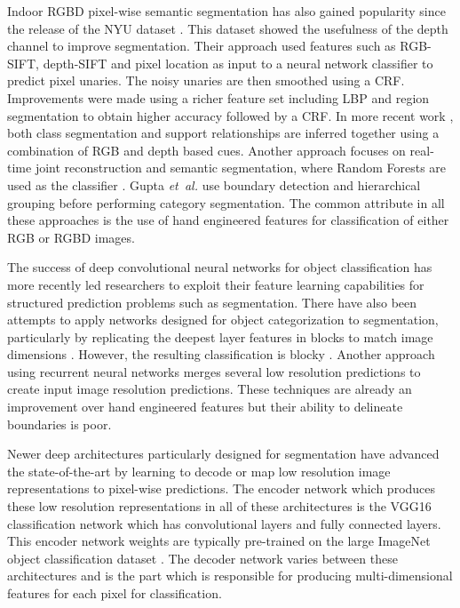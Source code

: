\documentclass[10pt,journal,compsoc]{IEEEtran}
\begin{document}
Indoor RGBD pixel-wise semantic segmentation has also gained popularity since the release of the NYU dataset \cite{silberman2012indoor}. This dataset showed the usefulness of the depth channel to improve segmentation. Their approach used features such as RGB-SIFT, depth-SIFT and pixel location as input to a neural network classifier to predict pixel unaries. The noisy unaries are then smoothed using a CRF. Improvements were made using a richer feature set including LBP and region segmentation to obtain higher accuracy \cite{ren2012rgb} followed by a CRF. In more recent work \cite{silberman2012indoor}, both class segmentation and support relationships are inferred together using a combination of RGB and depth based cues. Another approach focuses on real-time joint reconstruction and semantic segmentation, where Random Forests are used as the classifier \cite{Hermans14ICRA}. Gupta \emph{et~al.}  \cite{gupta2013perceptual} use boundary detection and hierarchical grouping before performing category segmentation. The common attribute in all these approaches is the use of hand engineered features for classification of either RGB or RGBD images. 

The success of deep convolutional neural networks for object classification has more recently led researchers to exploit their feature learning capabilities for structured prediction problems such as segmentation. There have also been attempts to apply networks designed for object categorization to segmentation, particularly by replicating the deepest layer features in blocks to match image dimensions \cite{FarabetPAMI,FarabetPurityCover,Grangier,Gatta}. However, the resulting classification is blocky \cite{Grangier}. Another approach using recurrent neural networks \cite{pinheiro2014recurrent} merges several low resolution predictions to create input image resolution predictions. These techniques are already an improvement over hand engineered features \cite{FarabetPAMI} but their ability to delineate boundaries is poor. 

Newer deep architectures \cite{FCN,noh2015learning,eigen2015predicting,hong2015decoupled,zheng2015conditional} particularly designed for segmentation have advanced the state-of-the-art by learning to decode or map low resolution image representations to pixel-wise predictions. The encoder network which produces these low resolution representations in all of these architectures is the VGG16 classification network \cite{simonyan2014very} which has  convolutional layers and  fully connected layers. This encoder network weights are typically pre-trained on the large ImageNet object classification dataset \cite{ImageNet}. The decoder network varies between these architectures and is the part which is responsible for producing multi-dimensional features for each pixel for classification.
\end{document}
